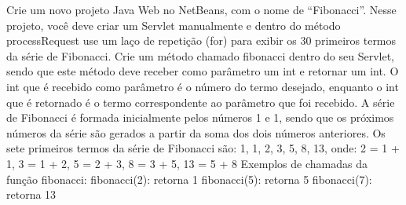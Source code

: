 \begin{projetoSemArquivo}{}{}{}
    Crie um novo projeto Java Web no NetBeans, com o nome de ``Fibonacci''. Nesse projeto, você deve criar um Servlet manualmente e dentro do método processRequest use um laço de repetição (for) para exibir os 30 primeiros termos da série de Fibonacci. Crie um método chamado fibonacci dentro do seu Servlet, sendo que este método deve receber como parâmetro um int e retornar um int. O int que é recebido como parâmetro é o número do termo desejado, enquanto o int que é retornado é o termo correspondente ao parâmetro que foi recebido. A série de Fibonacci é formada inicialmente pelos números 1 e 1, sendo que os próximos números da série são gerados a partir da soma dos dois números anteriores. Os sete primeiros termos da série de Fibonacci são:
    1, 1, 2, 3, 5, 8, 13, onde: 2 = 1 + 1, 3 = 1 + 2, 5 = 2 + 3, 8 = 3 + 5, 13 = 5 + 8
    Exemplos de chamadas da função fibonacci:
    fibonacci(2): retorna 1
    fibonacci(5): retorna 5
    fibonacci(7): retorna 13
\end{projetoSemArquivo}